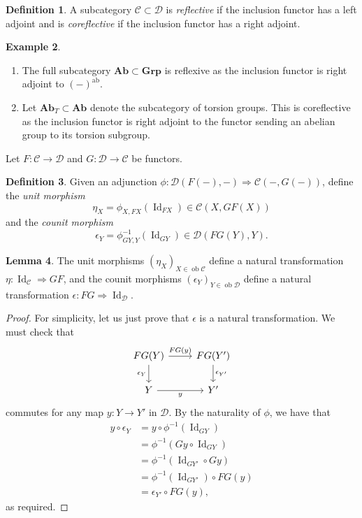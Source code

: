 \documentclass[10pt,letterpaper,cm]{nupset}
\theoremstyle{definition}
\newtheorem{definition}{Definition}[section]
\newtheorem{exmp}[definition]{Example}
\theoremstyle{theorem}
\newtheorem{lemma}[definition]{Lemma}
\theoremstyle{remark}
\newcommand{\1}{\mathbf{1}}
\renewcommand{\c}{\mathscr{C}}
\renewcommand{\d}{\mathscr{D}}
\newcommand{\0}{\vec 0}
\DeclareMathOperator{\id}{Id}
\DeclareMathOperator{\ab}{ab}
\DeclareMathOperator{\ob}{ob}
\begin{document}
\medskip

\begin{definition}
A subcategory $\c \subset \d$ is \textit{reflective} if the inclusion functor has a left adjoint and is \textit{coreflective} if the inclusion functor has a right adjoint. 
\end{definition}

\begin{exmp} $ $
\begin{enumerate}
\item The full subcategory $\mathbf{Ab}\subset \mathbf{Grp}$ is reflexive as the inclusion functor is right adjoint to $\left(-\right)^{\ab}$.
\item
Let $\mathbf{Ab}_T\subset \mathbf{Ab}$ denote the subcategory of torsion groups. This is coreflective as the inclusion functor is right adjoint to the functor sending an abelian group to its torsion subgroup.
\end{enumerate}
\end{exmp}

\medskip

Let $F: \c \to \d$ and $G: \d \to \c$ be functors.

\begin{definition}
Given an adjunction $\phi: \d(F(-), -) \Rightarrow \c(-, G(-))$, define the \textit{unit morphism } $$\eta_X =\phi_{X, F{X}}\left(\id_{F{X}}\right) \in \c(X, GF(X))$$ and the \textit{counit morphism} $$\epsilon_Y =\phi_{G{Y}, Y}^{{-1}}\left(\id_{G{Y}}\right) \in \d(FG(Y), Y).$$
\end{definition}

\begin{lemma}
The unit morphisms $\left(\eta_X\right)_{X\in \ob{\c}}$ define a natural transformation $\eta: \id_{\c} \Rightarrow GF$, and the counit morphisms $\left(\epsilon_Y\right)_{Y\in \ob{\d}}$ define a natural transformation $\epsilon: FG \Rightarrow \id_{\d}$.
\end{lemma}
\begin{proof}
For simplicity, let us just prove that $\epsilon$ is a natural transformation. We must check that
\[
\begin{tikzcd}
FG(Y) \arrow[d, "\epsilon_Y"'] \arrow[r, "FG(y)"] & FG(Y') \arrow[d, "\epsilon_{Y'}"] \\
Y \arrow[r, "y"']                             & Y'                               
\end{tikzcd}
\] commutes for any map $y: Y\to Y'$ in $\d$. By the naturality of $\phi$, we have that
\begin{align*}
y\circ \epsilon_Y  & =  y\circ \phi^{{-1}}\left(\id_{G{Y}}\right)
\\ & = \phi^{{-1}}\left(G{y} \circ \id_{G{Y}}\right)
\\ & =  \phi^{{-1}}\left(\id_{G{Y'}} \circ G{y}\right)
\\ & =   \phi^{{-1}}\left( \id_{G{Y'}}\right) \circ FG(y) 
\\ & = \epsilon_{Y'} \circ FG(y)
,\end{align*} as required.
\end{proof}
\end{document}
